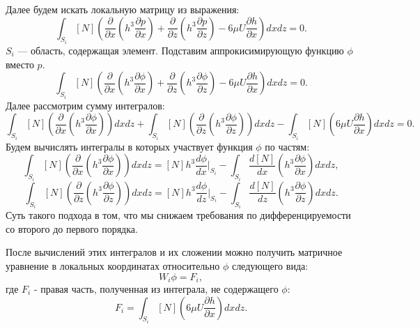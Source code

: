 \documentclass[12pt, a4paper]{article}
\begin{document}
Далее будем искать локальную матрицу из выражения:
\begin{equation*}
	\int_{S_i} {[N] \left(\frac{\partial}{\partial x} \left(h^3 \frac{\partial p}{\partial x} \right) + \frac{\partial}{\partial z} \left(h^3 \frac{\partial p}{\partial z} \right) - 6 \mu U \frac{\partial h}{\partial x}\right) dx dz} = 0.
\end{equation*}
$S_i$ --- область, содержащая элемент. 
Подставим аппрокисимирующую функцию $\phi$ вместо $p$.
\begin{equation*}
	\int_{S_i} {[N] \left(\frac{\partial}{\partial x} \left(h^3 \frac{\partial \phi}{\partial x} \right) + \frac{\partial}{\partial z} \left(h^3 \frac{\partial \phi}{\partial z} \right) - 6 \mu U \frac{\partial h}{\partial x}\right) dx dz} = 0.
\end{equation*}
Далее рассмотрим сумму интегралов:
\begin{equation*}
	\int_{S_i} {[N] \left(\frac{\partial}{\partial x} \left(h^3 \frac{\partial \phi}{\partial x} \right)\right) dx dz}
	+
	\int_{S_i} {[N] \left(\frac{\partial}{\partial z} \left(h^3 \frac{\partial \phi}{\partial z} \right)\right) dx dz} 
	-
	\int_{S_i} [N]\left(6 \mu U \frac{\partial h}{\partial x}\right) dx dz = 0.
\end{equation*}
Будем вычислять интегралы в которых участвует функция $\phi$ по частям:
\begin{equation*}
	\int_{S_i} {[N] \left(\frac{\partial}{\partial x} \left(h^3 \frac{\partial \phi}{\partial x} \right)\right) dx dz} = [N] h^3 \frac{d \phi}{dx}\Biggr|_{S_i} - \int_{S_i} {\frac{d[N]}{dx} \left(h^3 \frac{\partial \phi}{\partial x} \right) dx dz},
\end{equation*}
\begin{equation*}
	\int_{S_i} {[N] \left(\frac{\partial}{\partial z} \left(h^3 \frac{\partial \phi}{\partial z} \right)\right) dx dz} = [N] h^3 \frac{d \phi}{dz}\Biggr|_{S_i} - \int_{S_i} {\frac{d[N]}{dz} \left(h^3 \frac{\partial \phi}{\partial z} \right) dx dz}.
\end{equation*}
Суть такого подхода в том, что мы снижаем требования по дифференцируемости со второго до первого порядка.

После вычислений этих интегралов и их сложении можно получить матричное уравнение в локальных координатах относительно $\phi$ следующего вида:
\begin{equation}
W_i \phi = F_i,
\label{ref_local}
\end{equation}
где $F_i$ - правая часть, полученная из интеграла, не содержащего $\phi$:
\begin{equation*}
	F_i = \int_{S_i} [N]\left(6 \mu U \frac{\partial h}{\partial x}\right) dx dz.
\end{equation*}
\end{document}
